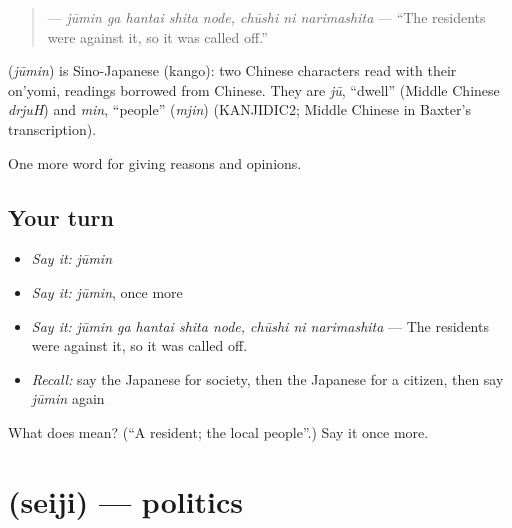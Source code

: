 \begin{quote}
\textbf{  } — \emph{jūmin ga hantai shita node, chūshi ni narimashita} — \textquotedblleft{}The residents were against it, so it was called off.\textquotedblright{}
\end{quote}

\begin{cousinweb}
\textbf{} (\emph{jūmin}) is Sino-Japanese (kango): two Chinese characters read with their on'yomi, readings borrowed from Chinese. They are \emph{jū}, \textquotedblleft{}dwell\textquotedblright{} (Middle Chinese \emph{drjuH}) and \emph{min}, \textquotedblleft{}people\textquotedblright{} (\emph{mjin}) (KANJIDIC2; Middle Chinese in Baxter's transcription).
\end{cousinweb}

\begin{grammarlens}[title={What you've built}]
One more word for giving reasons and opinions.
\end{grammarlens}

\subsection*{Your turn}
\begin{itemize}
\raggedright
  \item \emph{Say it:} \emph{jūmin}
  \item \emph{Say it:} \emph{jūmin}, once more
  \item \emph{Say it:} \emph{jūmin ga hantai shita node, chūshi ni narimashita} — The residents were against it, so it was called off.
  \item \emph{Recall:} say the Japanese for society, then the Japanese for a citizen, then say \emph{jūmin} again
\end{itemize}

\begin{tcolorbox}[breakable,colback=teal!4,colframe=teal!35!black,title={Before you move on}]
What does  mean? (\textquotedblleft{}A resident; the local people\textquotedblright{}.) Say it once more.
\end{tcolorbox}
\section[\texorpdfstring{\ja{せいじ} (seiji)}{せいじ (seiji)}]{ (seiji) — politics}

\label{lesson:JA-C331-seiji}



